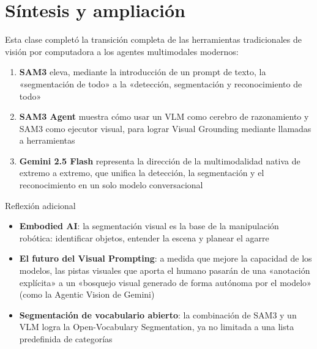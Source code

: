 \documentclass[a4paper]{article}
\begin{document}
\section{Síntesis y ampliación}

Esta clase completó la transición completa de las herramientas tradicionales de visión por computadora a los agentes multimodales modernos:

\begin{enumerate}
    \item \textbf{SAM3} eleva, mediante la introducción de un prompt de texto, la «segmentación de todo» a la «detección, segmentación y reconocimiento de todo»
    \item \textbf{SAM3 Agent} muestra cómo usar un VLM como cerebro de razonamiento y SAM3 como ejecutor visual, para lograr Visual Grounding mediante llamadas a herramientas
    \item \textbf{Gemini 2.5 Flash} representa la dirección de la multimodalidad nativa de extremo a extremo, que unifica la detección, la segmentación y el reconocimiento en un solo modelo conversacional
\end{enumerate}

\begin{knowledgebox}{Reflexión adicional}
\begin{itemize}
    \item \textbf{Embodied AI}: la segmentación visual es la base de la manipulación robótica: identificar objetos, entender la escena y planear el agarre
    \item \textbf{El futuro del Visual Prompting}: a medida que mejore la capacidad de los modelos, las pistas visuales que aporta el humano pasarán de una «anotación explícita» a un «bosquejo visual generado de forma autónoma por el modelo» (como la Agentic Vision de Gemini)
    \item \textbf{Segmentación de vocabulario abierto}: la combinación de SAM3 y un VLM logra la Open-Vocabulary Segmentation, ya no limitada a una lista predefinida de categorías
\end{itemize}
\end{knowledgebox}

\end{document}
